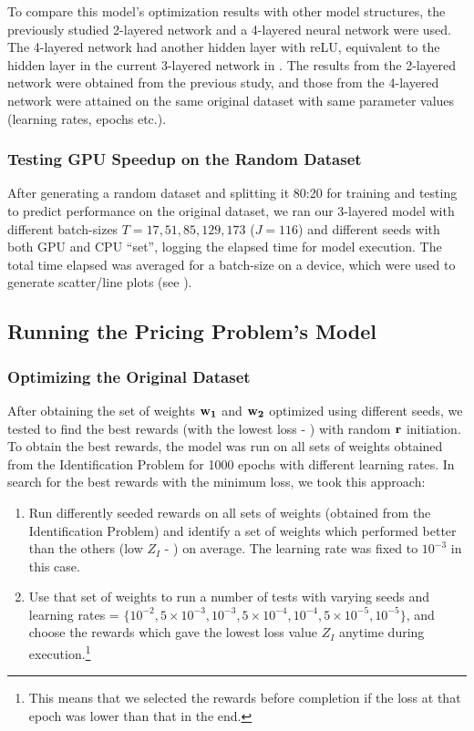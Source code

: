 To compare this model's optimization results with other model structures, the previously studied 2-layered network \cite{Xue2016Avi2} and a 4-layered neural network were used. The 4-layered network had another hidden layer with reLU, equivalent to the hidden layer in the current 3-layered network in . The results from the 2-layered network were obtained from the previous study, and those from the 4-layered network were attained on the same original dataset with same parameter values (learning rates, epochs etc.).

\subsubsection{Testing GPU Speedup on the Random Dataset} \label{sec:Identification Problem-Testing GPU Speedup on the Random Dataset}
After generating a random dataset and splitting it 80:20 for training and testing to predict performance on the original dataset, we ran our 3-layered model with different batch-sizes $T = 17, 51, 85, 129, 173$ ($J = 116$) and different seeds with both GPU and CPU ``set'', logging the elapsed time for model execution. The total time elapsed was averaged for a batch-size on a device, which were used to generate scatter/line plots (see ).

\subsection{Running the Pricing Problem's Model} \label{sec:Running the Pricing Problem's Model}
\subsubsection{Optimizing the Original Dataset} \label{sec:Pricing Problem-Optimizing the Original Dataset}
After obtaining the set of weights $\mathbf{w_1}$ and $\mathbf{w_2}$ optimized using different seeds, we tested to find the best rewards (with the lowest loss - ) with random $\mathbf{r}$ initiation. To obtain the best rewards, the model was run on all sets of weights obtained from the Identification Problem for 1000 epochs with different learning rates. In search for the best rewards with the minimum loss, we took this approach:
\begin{enumerate}
    \item Run differently seeded rewards on all sets of weights (obtained from the Identification Problem) and identify a set of weights which performed better than the others (low $Z_I$ - ) on average. The learning rate was fixed to $10^{-3}$ in this case.
    \item Use that set of weights to run a number of tests with varying seeds and learning rates = $\{10^{-2}, 5 \times 10^{-3}, 10^{-3}, 5 \times 10^{-4}, 10^{-4}, 5 \times 10^{-5}, 10^{-5}\}$, and choose the rewards which gave the lowest loss value $Z_I$ anytime during execution.\footnote{This means that we selected the rewards before completion if the loss at that epoch was lower than that in the end.} 
\end{enumerate}

